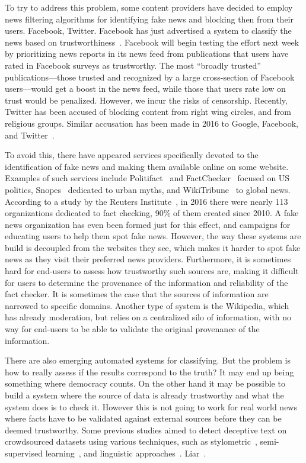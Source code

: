 \documentclass[letterpaper,twocolumn,10pt]{article}
\newcommand{\mypara}[1]{\vspace{5pt}\noindent{\bf {#1}}}
\begin{document}
\mypara{Content refereeing.} To try to address this problem, some content providers have decided to employ news filtering algorithms for identifying fake news and blocking then from their users. Facebook, Twitter. Facebook has just advertised a system to classify the news based on trustworthiness~\cite{fbrank}. Facebook will begin testing the effort next week by prioritizing news reports in its news feed from publications that users have rated in Facebook surveys as trustworthy. The most ``broadly trusted'' publications—those trusted and recognized by a large cross-section of Facebook users—would get a boost in the news feed, while those that users rate low on trust would be penalized. However, we incur the risks of censorship. Recently, Twitter has been accused of blocking content from right wing circles, and from religious groups. Similar accusation has been made in 2016 to Google, Facebook, and Twitter~\cite{accusedskew}.

\mypara{Fact checkers.} To avoid this, there have appeared services specifically devoted to the identification of fake news and making them available online on some website. Examples of such services include Politifact~\cite{politifact} and FactChecker~\cite{factchecker} focused on US politics, Snopes~\cite{snopes} dedicated to urban myths, and WikiTribune~\cite{wikitribune} to global news. According to a study by the Reuters Institute~\cite{risefackchecking}, in 2016 there were nearly 113 organizations dedicated to fact checking, 90\% of them created since 2010. A fake news organization has even been formed just for this effect, and campaigns for educating users to help them spot fake news. However, the way these systems are build is decoupled from the websites they see, which makes it harder to spot fake news as they visit their preferred news providers. Furthermore, it is sometimes hard for end-users to assess how trustworthy such sources are, making it difficult for users to determine the provenance of the information and reliability of the fact checker. It is sometimes the case that the sources of information are narrowed to specific domains. Another type of system is the Wikipedia, which has already moderation, but relies on a centralized silo of information, with no way for end-users to be able to validate the original provenance of the information.

\mypara{Automatic detection.} There are also emerging automated systems for classifying. But the problem is how to really assess if the results correspond to the truth? It may end up being something where democracy counts. On the other hand it may be possible to build a system where the source of data is already trustworthy and what the system does is to check it. However this is not going to work for real world news where facts have to be validated against external sources before they can be deemed trustworthy. Some previous studies aimed to detect deceptive text on crowdsourced datasets using various techniques, such as stylometric~\cite{stylometric}, semi-supervised learning~\cite{semisupervised}, and linguistic approaches~\cite{linguistic}. Liar~\cite{liar}.
\end{document}
